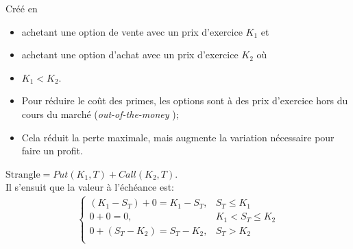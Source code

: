 \documentclass[10pt, french]{article}
\begin{document}
\begin{multicols*}{2}
\begin{definitionNOHFILL}
\begin{center}
\begin{tikzpicture}[x=0.75pt,y=0.75pt,yscale=-1,xscale=1]
\end{tikzpicture}
\end{center}
\end{definitionNOHFILL}


\begin{definitionNOHFILL}
Créé en 
\begin{itemize}[leftmargin = *]
	\item	achetant une option de vente avec un prix d'exercice $K_{1}$ et 
	\item	achetant une option d'achat avec un prix d'exercice $K_{2}$ où 
	\item	$K_{1} < K_{2}$.
\end{itemize}

\begin{distributions}[Contexte]
\begin{itemize}[leftmargin = *]
	\item	Pour réduire le coût des primes, les options sont à des prix d'exercice hors du cours du marché (\og \textit{out-of-the-money} \fg{});
	\item	Cela réduit la perte maximale, mais augmente la variation nécessaire pour faire un profit.
\end{itemize}
\end{distributions}

$\text{Strangle} = Put(K_1, T) + Call(K_2, T)$.\\

Il s'ensuit que la valeur à l'échéance est:
\begin{align*}
		\begin{cases}
		(K_{1} - S_{T})	+	0	=	K_{1} - S_{T},	&	S_{T} \le K_{1}	\\
		0	+	0	=	0,	&	K_{1} < S_{T} \le K_{2} 	\\
		0	+	(S_{T} - K_{2})	=	S_{T} - K_{2},	&	S_{T} >	K_{2}	\\
		\end{cases}
\end{align*}

\begin{center}
\end{center}
\end{definitionNOHFILL}
\end{multicols*}
\end{document}
